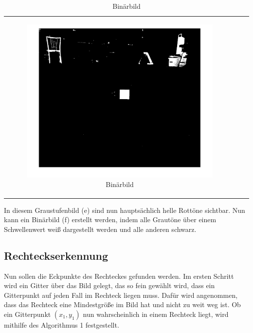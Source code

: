 \begin{center}
\begin{table}[ht]
\begin{tabular}{c c c}
\begin{subfigure}{0.3\textwidth}
\includegraphics[scale=0.08]{binaerbild.png} \vspace{-3.5mm}\caption{Binärbild}
\end{subfigure}
\end{tabular}
\end{table}
\end{center}
\vspace{-5mm}

In diesem Graustufenbild (e) sind nun hauptsächlich helle Rottöne sichtbar. Nun kann ein Binärbild (f) erstellt werden, indem alle Grautöne über einem Schwellenwert weiß dargestellt werden und alle anderen schwarz. 


\subsection{Rechteckserkennung}

Nun sollen die Eckpunkte des Rechteckes gefunden werden. Im ersten Schritt wird ein Gitter über das Bild gelegt, das so fein gewählt wird, dass ein Gitterpunkt auf jeden Fall im Rechteck liegen muss. Dafür wird angenommen, dass das Rechteck eine Mindestgröße im Bild hat und nicht zu weit weg ist. Ob ein Gitterpunkt $(x_1,y_1)$ nun wahrscheinlich in einem Rechteck liegt, wird mithilfe des Algorithmus 1 festgestellt.\\


